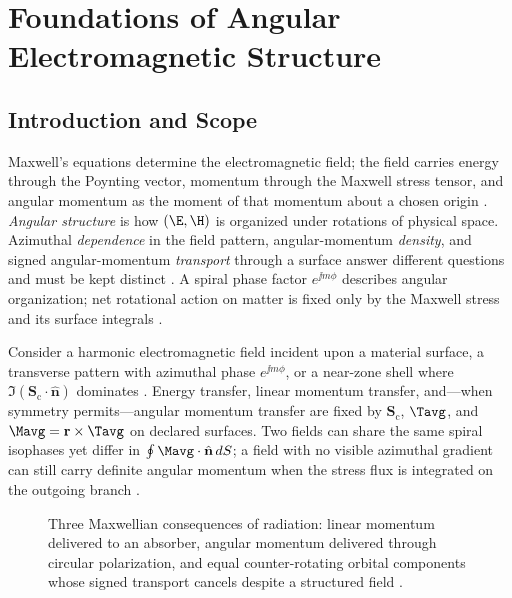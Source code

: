 ﻿%

\chapter{Foundations of Angular Electromagnetic Structure}
\label{ch:01}
\setcounter{section}{-1}

\section{Introduction and Scope}
\label{sec:ch01.0}

Maxwell's equations determine the electromagnetic field; the field carries energy through the Poynting vector, momentum through the Maxwell stress tensor, and angular momentum as the moment of that momentum about a chosen origin \cite{maxwell1873,poynting1884,beth1936}. \emph{Angular structure} is how $(\E,\H)$ is organized under rotations of physical space. Azimuthal \emph{dependence} in the field pattern, angular-momentum \emph{density}, and signed angular-momentum \emph{transport} through a surface answer different questions and must be kept distinct \cite{stratton1941,beth1936}. A spiral phase factor $e^{\jj m\phi}$ describes angular organization; net rotational action on matter is fixed only by the Maxwell stress and its surface integrals \cite{allen1992}.

Consider a harmonic electromagnetic field incident upon a material surface, a transverse pattern with azimuthal phase $e^{\jj m\phi}$, or a near-zone shell where $\Im(\mathbf{S}_\mathrm{c}\cdot\hat{\mathbf{n}})$ dominates \cite{stratton1941,beth1936}. Energy transfer, linear momentum transfer, and---when symmetry permits---angular momentum transfer are fixed by $\mathbf{S}_\mathrm{c}$, $\Tavg$, and $\Mavg=\mathbf{r}\times\Tavg$ on declared surfaces. Two fields can share the same spiral isophases yet differ in $\oint \Mavg\cdot\hat{\mathbf{n}}\,dS$; a field with no visible azimuthal gradient can still carry definite angular momentum when the stress flux is integrated on the outgoing branch \cite{stratton1941}.

\begin{figure}[t]
\centering
\VolIPhysFig{\VolIPhysThreeRadiationConsequences}
\caption{Three Maxwellian consequences of radiation: linear momentum delivered to an absorber, angular momentum delivered through circular polarization, and equal counter-rotating orbital components whose signed transport cancels despite a structured field \cite{poynting1884,beth1936,allen1992}.}
\label{fig:ch1.three-radiation-consequences}
\end{figure}

